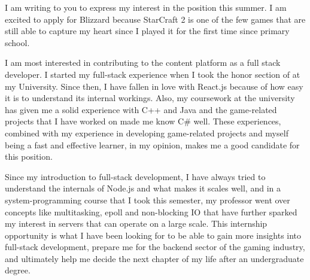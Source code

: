I am writing to you to express my interest in the
 position this summer.
I am excited to apply for Blizzard because StarCraft 2 is one of
the few games that are still able to capture my heart since I played
it for the first time since primary school.

I am most interested in contributing to the content platform as a full
stack developer. I started my full-stack experience
when I took the honor section of  at my
University. Since then, I have fallen in love with React.js because of
how easy it is to understand its internal workings.
Also, my coursework at the university has given me a solid
experience with C++ and Java and the game-related projects that I have worked
on made me know C\# well.
These experiences,
combined with my experience in developing game-related projects and
myself being a fast and effective learner,
in my opinion, makes me a good candidate for this position.

Since my introduction to full-stack development, I have always tried to
understand the internals of Node.js and what makes it scales well,
and in a system-programming course that I took this semester, my professor went
over concepts like multitasking, epoll and non-blocking IO that
have further sparked my interest in servers
that can operate on a large scale.
This internship opportunity is what I have been looking for to
be able to gain more insights into full-stack development,
prepare me for the backend sector of the gaming industry,
and ultimately help me decide the next chapter of my life after an
undergraduate degree.

